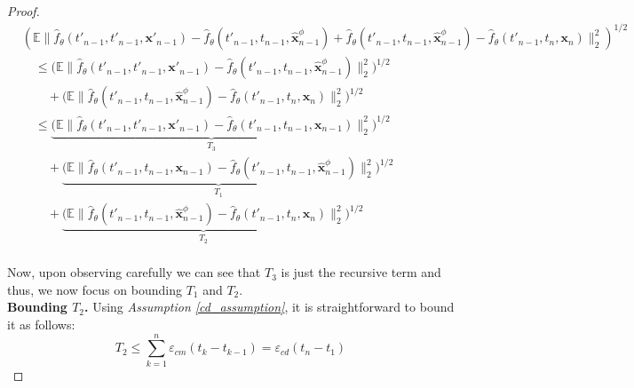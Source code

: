 \documentclass[11pt]{article}
\def\rvx{{\mathbf{x}}}
\newcommand{\E}{\mathbb{E}}
\begin{document}
\begin{proof}
\begin{align*}
    &  \left(\E  
  \| 
  \hat{f}_\theta(t'_{n-1},t'_{n-1},{\rvx}'_{n-1}) - \hat{f}_\theta(t'_{n-1},t_{n-1},\hat{\rvx}^\phi_{n-1}) + \hat{f}_\theta(t'_{n-1},t_{n-1},\hat{\rvx}^\phi_{n-1})-\hat{f}_\theta(t'_{n-1},t_n,{\rvx}_n)\|_2^2 \right)^{1/2} \\
  & \quad \leq   {( \E  
  \| 
  \hat{f}_\theta(t'_{n-1},t'_{n-1},{\rvx}'_{n-1}) - \hat{f}_\theta(t'_{n-1},t_{n-1},\hat{\rvx}^\phi_{n-1})\|_2^2} )^{1/2}  \\ & \qquad + {(\E  
  \|\hat{f}_\theta(t'_{n-1},t_{n-1},\hat{\rvx}^\phi_{n-1})-\hat{f}_\theta(t'_{n-1},t_n,{\rvx}_n)\|_2^2})^{1/2} \\
 & \quad\leq  \underbrace{( \E  
  \| 
  \hat{f}_\theta(t'_{n-1},t'_{n-1},{\rvx}'_{n-1}) - \hat{f}_\theta(t'_{n-1},t_{n-1},{\rvx}_{n-1})\|_2^2}_{T_3} )^{1/2}  \\ & \qquad + \underbrace{( \E  
  \| 
  \hat{f}_\theta(t'_{n-1},t_{n-1},{\rvx}_{n-1}) - \hat{f}_\theta(t'_{n-1},t_{n-1},\hat{\rvx}^\phi_{n-1})\|_2^2}_{T_1} )^{1/2}\\ & \qquad + \underbrace{(\E  
  \|\hat{f}_\theta(t'_{n-1},t_{n-1},\hat{\rvx}^\phi_{n-1})-\hat{f}_\theta(t'_{n-1},t_n,{\rvx}_n)\|_2^2}_{T_2})^{1/2} \\
\end{align*}

\noindent
Now, upon observing carefully we can see that $T_3$ is just the recursive term and thus, we now focus on bounding $T_1$ and $T_2$. \\

\noindent
\textbf{Bounding $T_2$.} Using \textit{Assumption \ref{cd_assumption}}, it is straightforward to bound it as follows:
\[
T_2 \leq \sum_{k=1}^n\varepsilon_{cm}(t_k-t_{k-1}) = \varepsilon_{cd}(t_n-t_1)
\] 


\end{proof}
\end{document}
